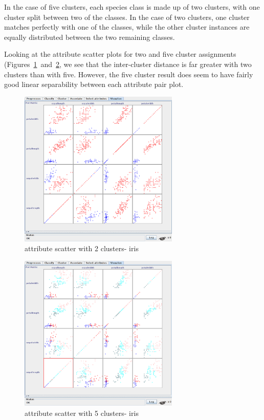\documentclass{sig-alternate}
\begin{document}
In the case of five clusters, each species class is made up of two clusters, with one cluster split between two of the classes. In the case of two clusters, one cluster matches perfectly with one of the classes, while the other cluster instances are equally distributed between the two remaining classes.

Looking at the attribute scatter plots for two and five cluster assignments (Figures~\ref{iris-attr-scatter-cluster-2}~and~\ref{iris-attr-scatter-cluster-5}, we see that the inter-cluster distance is far greater with two clusters than with five. However, the five cluster result does seem to have fairly good linear separability between each attribute pair plot.

\begin{figure}[!htbp]
    \centering
    \includegraphics[width=3in]{part2/iris/attribute-scatter-cluster-2.pdf}
    \caption{attribute scatter with 2 clusters- iris\label{iris-attr-scatter-cluster-2}}
\end{figure} 

\begin{figure}[!htbp]
    \centering
    \includegraphics[width=3in]{part2/iris/attribute-scatter-cluster-5.pdf}
    \caption{attribute scatter with 5 clusters- iris\label{iris-attr-scatter-cluster-5}}
\end{figure} 
\end{document}
